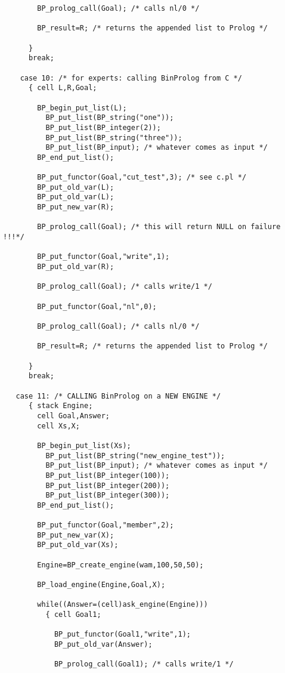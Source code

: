 \documentclass{article}
\begin{document}
{\begin{verbatim}
        BP_prolog_call(Goal); /* calls nl/0 */

        BP_result=R; /* returns the appended list to Prolog */

      }
      break;

    case 10: /* for experts: calling BinProlog from C */
      { cell L,R,Goal;
        
        BP_begin_put_list(L);
          BP_put_list(BP_string("one"));
          BP_put_list(BP_integer(2));
          BP_put_list(BP_string("three"));
          BP_put_list(BP_input); /* whatever comes as input */
        BP_end_put_list();
  
        BP_put_functor(Goal,"cut_test",3); /* see c.pl */
        BP_put_old_var(L);
        BP_put_old_var(L);
        BP_put_new_var(R);        

        BP_prolog_call(Goal); /* this will return NULL on failure !!!*/

        BP_put_functor(Goal,"write",1);
        BP_put_old_var(R);    

        BP_prolog_call(Goal); /* calls write/1 */

        BP_put_functor(Goal,"nl",0);

        BP_prolog_call(Goal); /* calls nl/0 */

        BP_result=R; /* returns the appended list to Prolog */

      }
      break;

   case 11: /* CALLING BinProlog on a NEW ENGINE */
      { stack Engine;
        cell Goal,Answer;
        cell Xs,X;
        
        BP_begin_put_list(Xs);
          BP_put_list(BP_string("new_engine_test"));
          BP_put_list(BP_input); /* whatever comes as input */
          BP_put_list(BP_integer(100));
          BP_put_list(BP_integer(200));
          BP_put_list(BP_integer(300));
        BP_end_put_list();
  
        BP_put_functor(Goal,"member",2);
        BP_put_new_var(X);        
        BP_put_old_var(Xs);

        Engine=BP_create_engine(wam,100,50,50);

        BP_load_engine(Engine,Goal,X);

        while((Answer=(cell)ask_engine(Engine)))
          { cell Goal1;

            BP_put_functor(Goal1,"write",1);
            BP_put_old_var(Answer);    

            BP_prolog_call(Goal1); /* calls write/1 */


\end{verbatim}}
\end{document}
